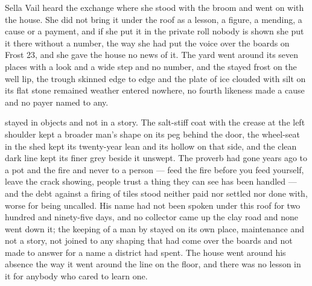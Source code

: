 \scenebreak

Sella Vail heard the exchange where she stood with the broom and went on with the house. She did not bring it under the roof as a lesson, a figure, a mending, a cause or a payment, and if she put it in the private roll nobody is shown she put it there without a number, the way she had put the voice over the boards on Frost 23, and she gave the house no news of it. The yard went around its seven places with a look and a wide step and no number, and the stayed frost on the well lip, the trough skinned edge to edge and the plate of ice clouded with silt on its flat stone remained weather entered nowhere, no fourth likeness made a cause and no payer named to any.

 stayed in objects and not in a story. The salt-stiff coat with the crease at the left shoulder kept a broader man's shape on its peg behind the door, the wheel-seat in the shed kept its twenty-year lean and its hollow on that side, and the clean dark line kept its finer grey beside it unswept. The proverb had gone years ago to a pot and the fire and never to a person --- feed the fire before you feed yourself, leave the crack showing, people trust a thing they can see has been handled --- and the debt against a firing of tiles stood neither paid nor settled nor done with, worse for being uncalled. His name had not been spoken under this roof for two hundred and ninety-five days, and no collector came up the clay road and none went down it; the keeping of a man by  stayed on its own place, maintenance and not a story, not joined to any shaping that had come over the boards and not made to answer for a name a district had spent. The house went around his absence the way it went around the line on the floor, and there was no lesson in it for anybody who cared to learn one.

